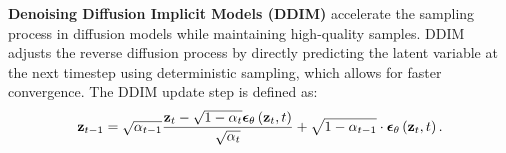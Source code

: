 

\textbf{Denoising Diffusion Implicit Models (DDIM)} \citep{song2021score} accelerate the sampling process in diffusion models while maintaining high-quality samples. DDIM adjusts the reverse diffusion process by directly predicting the latent variable at the next timestep using deterministic sampling, which allows for faster convergence. The DDIM update step is defined as:
\begin{equation}
\small
\mathbf{z}_{t-1}=\sqrt{\alpha_{t-1}}\frac{\mathbf{z}_t-\sqrt{1-\alpha_t} \boldsymbol{\epsilon}_\theta\left(\mathbf{z}_t, t\right)}{\sqrt{\alpha_t}}+\sqrt{1-\alpha_{t-1}} \cdot \boldsymbol{\epsilon}_\theta\left(\mathbf{z}_t, t\right).
\end{equation}
